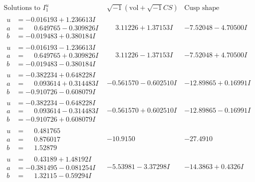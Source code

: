 \documentclass[1p]{elsarticle_modified}
\theoremstyle{definition}
\newcommand{\I}{\sqrt{-1}}
\begin{document}
$$\begin{array}{c|c|c}  
\text{Solutions to }I^u_{1}& \I (\text{vol} + \sqrt{-1}CS) & \text{Cusp shape}\\
 \hline 
\begin{aligned}
u &= -0.016193 + 1.236613 I \\
a &= \phantom{-}0.649765 - 0.309826 I \\
b &= -0.019483 + 0.380184 I\end{aligned}
 & \phantom{-}3.11226 + 1.37153 I & -7.52048 - 4.70500 I \\ \hline\begin{aligned}
u &= -0.016193 - 1.236613 I \\
a &= \phantom{-}0.649765 + 0.309826 I \\
b &= -0.019483 - 0.380184 I\end{aligned}
 & \phantom{-}3.11226 - 1.37153 I & -7.52048 + 4.70500 I \\ \hline\begin{aligned}
u &= -0.382234 + 0.648228 I \\
a &= \phantom{-}0.093614 + 0.314483 I \\
b &= -0.910726 - 0.608079 I\end{aligned}
 & -0.561570 - 0.602510 I & -12.89865 + 0.16991 I \\ \hline\begin{aligned}
u &= -0.382234 - 0.648228 I \\
a &= \phantom{-}0.093614 - 0.314483 I \\
b &= -0.910726 + 0.608079 I\end{aligned}
 & -0.561570 + 0.602510 I & -12.89865 - 0.16991 I \\ \hline\begin{aligned}
u &= \phantom{-}0.481765\phantom{ +0.000000I} \\
a &= \phantom{-}0.876017\phantom{ +0.000000I} \\
b &= \phantom{-}1.52879\phantom{ +0.000000I}\end{aligned}
 & -10.9150\phantom{ +0.000000I} & -27.4910\phantom{ +0.000000I} \\ \hline\begin{aligned}
u &= \phantom{-}0.43189 + 1.48192 I \\
a &= -0.381495 - 0.081254 I \\
b &= \phantom{-}1.32115 - 0.59294 I\end{aligned}
 & -5.53981 - 3.37298 I & -14.3863 + 0.4326 I \\ \hline\begin{aligned}

\end{aligned}
\end{array}$$
\end{document}
